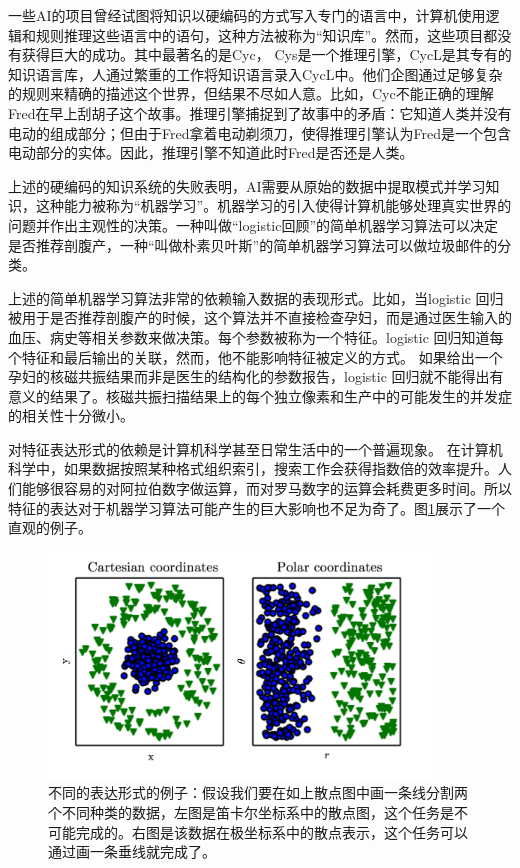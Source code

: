 \documentclass[a4paper,11pt]{book}
\begin{document}
一些AI的项目曾经试图将知识以硬编码的方式写入专门的语言中，计算机使用逻辑和规则推理这些语言中的语句，这种方法被称为“知识库”。然而，这些项目都没有获得巨大的成功。其中最著名的是Cyc， Cys是一个推理引擎，CycL是其专有的知识语言库，人通过繁重的工作将知识语言录入CycL中。他们企图通过足够复杂的规则来精确的描述这个世界，但结果不尽如人意。比如，Cyc不能正确的理解Fred在早上刮胡子这个故事。推理引擎捕捉到了故事中的矛盾：它知道人类并没有电动的组成部分；但由于Fred拿着电动剃须刀，使得推理引擎认为Fred是一个包含电动部分的实体。因此，推理引擎不知道此时Fred是否还是人类。

上述的硬编码的知识系统的失败表明，AI需要从原始的数据中提取模式并学习知识，这种能力被称为“机器学习”。机器学习的引入使得计算机能够处理真实世界的问题并作出主观性的决策。一种叫做“logistic回顾”的简单机器学习算法可以决定是否推荐剖腹产，一种“叫做朴素贝叶斯”的简单机器学习算法可以做垃圾邮件的分类。


上述的简单机器学习算法非常的依赖输入数据的表现形式。比如，当logistic 回归被用于是否推荐剖腹产的时候，这个算法并不直接检查孕妇，而是通过医生输入的血压、病史等相关参数来做决策。每个参数被称为一个特征。logistic 回归知道每个特征和最后输出的关联，然而，他不能影响特征被定义的方式。 如果给出一个孕妇的核磁共振结果而非是医生的结构化的参数报告，logistic 回归就不能得出有意义的结果了。核磁共振扫描结果上的每个独立像素和生产中的可能发生的并发症的相关性十分微小。


对特征表达形式的依赖是计算机科学甚至日常生活中的一个普遍现象。 在计算机科学中，如果数据按照某种格式组织索引，搜索工作会获得指数倍的效率提升。人们能够很容易的对阿拉伯数字做运算，而对罗马数字的运算会耗费更多时间。所以特征的表达对于机器学习算法可能产生的巨大影响也不足为奇了。图\ref{fig:represent}展示了一个直观的例子。
\begin{figure}[htbp] %
   \centering
   \includegraphics[width=4in]{fig/chap1/represent.png} 
   \caption{不同的表达形式的例子：假设我们要在如上散点图中画一条线分割两个不同种类的数据，左图是笛卡尔坐标系中的散点图，这个任务是不可能完成的。右图是该数据在极坐标系中的散点表示，这个任务可以通过画一条垂线就完成了。}
   \label{fig:represent}
\end{figure}
\end{document}
